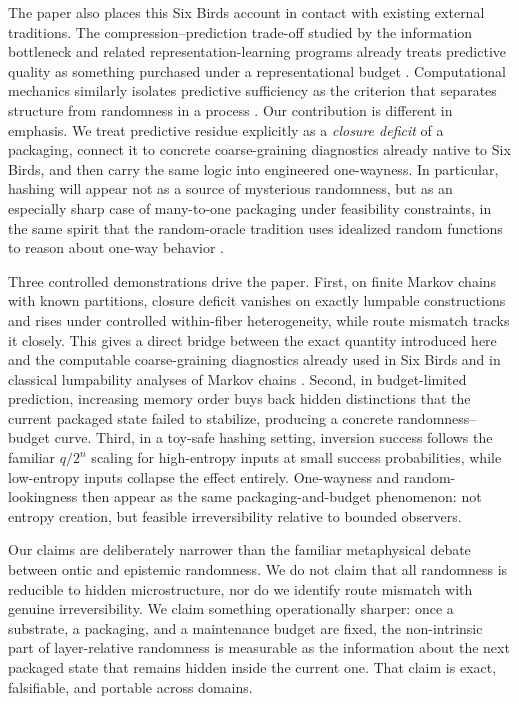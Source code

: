 \documentclass[11pt]{article}
\numberwithin{equation}{section}
\begin{document}
The paper also places this Six Birds account in contact with existing external traditions. The compression--prediction trade-off studied by the information bottleneck and related representation-learning programs already treats predictive quality as something purchased under a representational budget \citep{tishby1999bottleneck,geiger2015optimalkullbackleibleraggregation}. Computational mechanics similarly isolates predictive sufficiency as the criterion that separates structure from randomness in a process \citep{shalizi2001computationalmechanics}. Our contribution is different in emphasis. We treat predictive residue explicitly as a \emph{closure deficit} of a packaging, connect it to concrete coarse-graining diagnostics already native to Six Birds, and then carry the same logic into engineered one-wayness. In particular, hashing will appear not as a source of mysterious randomness, but as an especially sharp case of many-to-one packaging under feasibility constraints, in the same spirit that the random-oracle tradition uses idealized random functions to reason about one-way behavior \citep{bellare1993randomoracles}.

Three controlled demonstrations drive the paper. First, on finite Markov chains with known partitions, closure deficit vanishes on exactly lumpable constructions and rises under controlled within-fiber heterogeneity, while route mismatch tracks it closely. This gives a direct bridge between the exact quantity introduced here and the computable coarse-graining diagnostics already used in Six Birds and in classical lumpability analyses of Markov chains \citep{kemeny1976finitemarkovchains,buchholz1994exactordinarylumpability,tsiokos2026pica}. Second, in budget-limited prediction, increasing memory order buys back hidden distinctions that the current packaged state failed to stabilize, producing a concrete randomness--budget curve. Third, in a toy-safe hashing setting, inversion success follows the familiar $q/2^n$ scaling for high-entropy inputs at small success probabilities, while low-entropy inputs collapse the effect entirely. One-wayness and random-lookingness then appear as the same packaging-and-budget phenomenon: not entropy creation, but feasible irreversibility relative to bounded observers.

Our claims are deliberately narrower than the familiar metaphysical debate between ontic and epistemic randomness. We do not claim that all randomness is reducible to hidden microstructure, nor do we identify route mismatch with genuine irreversibility. We claim something operationally sharper: once a substrate, a packaging, and a maintenance budget are fixed, the non-intrinsic part of layer-relative randomness is measurable as the information about the next packaged state that remains hidden inside the current one. That claim is exact, falsifiable, and portable across domains.
\end{document}
